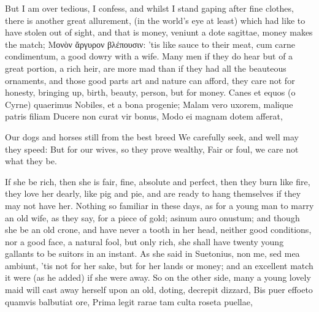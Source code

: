 {But I am over tedious, I confess, and whilst I stand gaping after fine
clothes, there is another great allurement, (in the world's eye at
least) which had like to have stolen out of sight, and that is money,
veniunt a dote sagittae, money makes the match; \textgreek{Μονὸν ἄργυρον
βλέπουσιν}: 'tis like sauce to their meat, cum carne condimentum, a good
dowry with a wife. Many men if they do hear but of a great portion, a
rich heir, are more mad than if they had all the beauteous ornaments,
and those good parts art and nature can afford, they care not for
honesty, bringing up, birth, beauty, person, but for money.
Canes et equos (o Cyrne) quaerimus
Nobiles, et a bona progenie;
Malam vero uxorem, malique patris filiam
Ducere non curat vir bonus,
Modo ei magnam dotem afferat,

Our dogs and horses still from the best breed
We carefully seek, and well may they speed:
But for our wives, so they prove wealthy,
Fair or foul, we care not what they be.

If she be rich, then she is fair, fine, absolute and perfect, then they
burn like fire, they love her dearly, like pig and pie, and are ready
to hang themselves if they may not have her. Nothing so familiar in
these days, as for a young man to marry an old wife, as they say, for a
piece of gold; asinum auro onustum; and though she be an old crone, and
have never a tooth in her head, neither good conditions, nor a good
face, a natural fool, but only rich, she shall have twenty young
gallants to be suitors in an instant. As she said in Suetonius, non me,
sed mea ambiunt, 'tis not for her sake, but for her lands or money; and
an excellent match it were (as he added) if she were away. So on the
other side, many a young lovely maid will cast away herself upon an
old, doting, decrepit dizzard,
Bis puer effoeto quamvis balbutiat ore,
Prima legit rarae tam culta roseta puellae,

}
